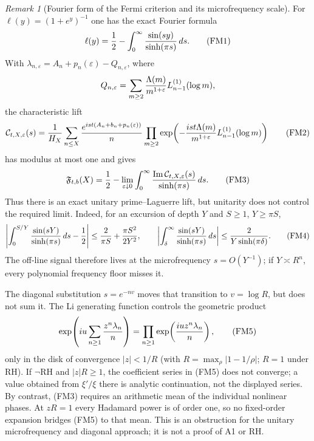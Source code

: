 \documentclass[11pt]{amsart}
\theoremstyle{definition}
\theoremstyle{remark}
\newtheorem{remark}[theorem]{Remark}
\theoremstyle{definition}
\newcommand{\RH}{\mathrm{RH}}
\renewcommand{\Im}{\operatorname{Im}}
\begin{document}
\begin{remark}[Fourier form of the Fermi criterion and its microfrequency scale]
\label{rmk:fermi-microfrequency-gate}
For $\ell(y)=(1+e^y)^{-1}$ one has the exact Fourier formula
\[
 \ell(y)={1\over2}-\int_0^\infty{\sin(sy)\over\sinh(\pi s)}\,ds.          \tag{FM1}
\]
With $\lambda_{n,\varepsilon}=A_n+p_n(\varepsilon)-Q_{n,\varepsilon}$,
where
\[
 Q_{n,\varepsilon}=\sum_{m\ge2}{\Lambda(m)\over m^{1+\varepsilon}}
 L_{n-1}^{(1)}(\log m),
\]
the characteristic lift
\[
 \mathcal C_{t,X,\varepsilon}(s)
 ={1\over H_X}\sum_{n\le X}{e^{ist(A_n+b_n+p_n(\varepsilon))}\over n}
 \prod_{m\ge2}\exp\!\left(
 -{ist\Lambda(m)\over m^{1+\varepsilon}}L_{n-1}^{(1)}(\log m)\right)
                                                                    \tag{FM2}
\]
has modulus at most one and gives
\[
 \mathfrak F_{t,b}(X)={1\over2}-\lim_{\varepsilon\downarrow0}
 \int_0^\infty{\Im\mathcal C_{t,X,\varepsilon}(s)\over\sinh(\pi s)}\,ds.
                                                                    \tag{FM3}
\]
Thus there is an exact unitary prime--Laguerre lift, but unitarity does not
control the required limit.  Indeed, for an excursion of depth $Y$ and
$S\ge1$, $Y\ge\pi S$,
\[
 \left|\int_0^{S/Y}{\sin(sY)\over\sinh(\pi s)}\,ds-{1\over2}\right|
 \le {2\over\pi S}+{\pi S^2\over2Y^2},
 \qquad
 \left|\int_\delta^\infty{\sin(sY)\over\sinh(\pi s)}\,ds\right|
 \le {2\over Y\sinh(\pi\delta)}.                         \tag{FM4}
\]
The off-line signal therefore lives at the microfrequency $s=O(Y^{-1})$;
if $Y\asymp R^n$, every polynomial frequency floor misses it.

The diagonal substitution $s=e^{-nv}$ moves that transition to
$v=\log R$, but does not sum it.  The Li generating function controls the
geometric product
\[
 \exp\!\left(iu\sum_{n\ge1}{z^n\lambda_n\over n}\right)
 =\prod_{n\ge1}\exp\!\left({iu z^n\lambda_n\over n}\right),             \tag{FM5}
\]
only in the disk of convergence $|z|<1/R$ (with $R=\max_\rho|1-1/\rho|$;
$R=1$ under RH).  If $\neg\RH$ and
$|z|R\ge1$, the coefficient series in (FM5) does not converge; a value
obtained from $\xi'/\xi$ there is analytic continuation, not the displayed
series.
By contrast, (FM3) requires an arithmetic mean of the individual nonlinear
phases.  At $zR=1$ every Hadamard power is of order one, so no fixed-order
expansion bridges (FM5) to that mean.  This is an obstruction for the
unitary microfrequency and diagonal approach; it is not a proof of A1 or RH.
\end{remark}
\end{document}
